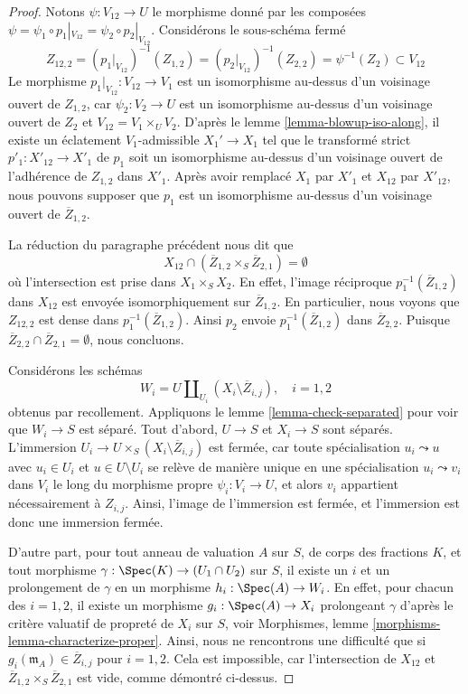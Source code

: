 \begin{proof}
\medskip\noindent
Notons $\psi : V_{12} \to U$ le morphisme donné par les composées
$\psi = \psi_1 \circ p_1|_{V_{12}} = \psi_2 \circ p_2|_{V_{12}}$.
Considérons le sous-schéma fermé
$$
Z_{12, 2} =
(p_1|_{V_{12}})^{-1}(Z_{1, 2}) =
(p_2|_{V_{12}})^{-1}(Z_{2, 2}) =
\psi^{-1}(Z_2) \subset V_{12}
$$
Le morphisme $p_1|_{V_{12}} : V_{12} \to V_1$ est un isomorphisme
au-dessus d'un voisinage ouvert de $Z_{1, 2}$, car $\psi_2 : V_2 \to U$
est un isomorphisme au-dessus d'un voisinage ouvert de $Z_2$ et
$V_{12} = V_1 \times_U V_2$.
D'après le lemme \ref{lemma-blowup-iso-along},
il existe un éclatement $V_1$-admissible $X_1' \to X_1$
tel que le transformé strict $p'_1 : X'_{12} \to X'_1$
de $p_1$ soit un isomorphisme au-dessus d'un voisinage ouvert de
l'adhérence de $Z_{1, 2}$ dans $X'_1$.
Après avoir remplacé $X_1$ par $X'_1$ et $X_{12}$ par $X'_{12}$,
nous pouvons supposer que $p_1$ est un isomorphisme au-dessus d'un voisinage
ouvert de $\overline{Z}_{1, 2}$.

\medskip\noindent
La réduction du paragraphe précédent nous dit que
$$
X_{12} \cap (\overline{Z}_{1, 2} \times_S \overline{Z}_{2, 1}) = \emptyset
$$
où l'intersection est prise dans $X_1 \times_S X_2$. En effet, l'image
réciproque $p_1^{-1}(\overline{Z}_{1, 2})$ dans $X_{12}$ est envoyée isomorphiquement
sur $\overline{Z}_{1, 2}$. En particulier, nous voyons que $Z_{12, 2}$
est dense dans $p_1^{-1}(\overline{Z}_{1, 2})$. Ainsi $p_2$ envoie
$p_1^{-1}(\overline{Z}_{1, 2})$ dans $\overline{Z}_{2, 2}$.
Puisque $\overline{Z}_{2, 2} \cap \overline{Z}_{2, 1} = \emptyset$,
nous concluons.

\medskip\noindent
Considérons les schémas
$$
W_i = U \coprod\nolimits_{U_i} (X_i \setminus \overline{Z}_{i, j}),
\quad i = 1, 2
$$
obtenus par recollement. Appliquons le lemme \ref{lemma-check-separated}
pour voir que $W_i \to S$ est séparé. Tout d'abord,
$U \to S$ et $X_i \to S$ sont séparés. L'immersion
$U_i \to U \times_S (X_i \setminus \overline{Z}_{i, j})$
est fermée, car toute spécialisation $u_i \leadsto u$
avec $u_i \in U_i$ et $u \in U \setminus U_i$
se relève de manière unique en une spécialisation
$u_i \leadsto v_i$ dans $V_i$ le long du morphisme propre
$\psi_i : V_i \to U$, et alors $v_i$ appartient nécessairement à $Z_{i, j}$.
Ainsi, l'image de l'immersion est fermée, et l'immersion
est donc une immersion fermée.

\medskip\noindent
D'autre part, pour tout anneau de valuation $A$ sur $S$, de corps des fractions $K$,
et tout morphisme $\gamma : \Spec(K) \to (U_1 \cap U_2)$ sur $S$, il
existe un $i$ et un prolongement de $\gamma$ en un morphisme $h_i : \Spec(A) \to W_i$.
En effet, pour chacun des $i = 1, 2$, il existe un morphisme
$g_i : \Spec(A) \to X_i$ prolongeant $\gamma$ d'après le
critère valuatif de propreté de $X_i$ sur $S$, voir
Morphismes, lemme \ref{morphisms-lemma-characterize-proper}.
Ainsi, nous ne rencontrons une difficulté
que si $g_i(\mathfrak m_A) \in \overline{Z}_{i, j}$ pour $i = 1, 2$. Cela est
impossible, car l'intersection de $X_{12}$ et
$\overline{Z}_{1, 2} \times_S \overline{Z}_{2, 1}$ est vide, comme démontré ci-dessus.


\end{proof}
